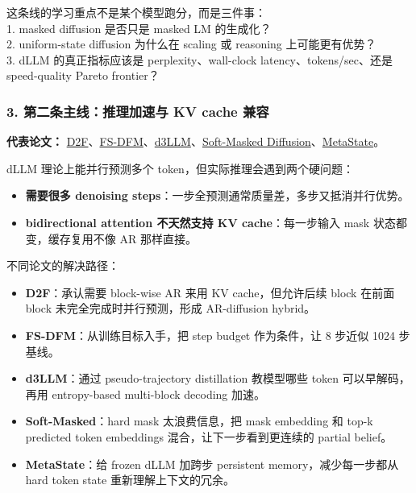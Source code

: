 \begin{summarybox}
这条线的学习重点不是某个模型跑分，而是三件事：\\
1. masked diffusion 是否只是 masked LM 的生成化？\\
2. uniform-state diffusion 为什么在 scaling 或 reasoning 上可能更有优势？\\
3. dLLM 的真正指标应该是 perplexity、wall-clock latency、tokens/sec、还是 speed-quality Pareto frontier？
\end{summarybox}

\subsubsection{3. 第二条主线：推理加速与 KV cache 兼容}

\textbf{代表论文：} \href{https://arxiv.org/abs/2508.09192}{D2F}、\href{https://arxiv.org/abs/2509.20624}{FS-DFM}、\href{https://arxiv.org/abs/2601.07568}{d3LLM}、\href{https://arxiv.org/abs/2510.17206}{Soft-Masked Diffusion}、\href{https://arxiv.org/abs/2603.01331}{MetaState}。

dLLM 理论上能并行预测多个 token，但实际推理会遇到两个硬问题：

\begin{itemize}[leftmargin=1.5em]
  \item \textbf{需要很多 denoising steps}：一步全预测通常质量差，多步又抵消并行优势。
  \item \textbf{bidirectional attention 不天然支持 KV cache}：每一步输入 mask 状态都变，缓存复用不像 AR 那样直接。
\end{itemize}

不同论文的解决路径：

\begin{itemize}[leftmargin=1.5em]
  \item \textbf{D2F}：承认需要 block-wise AR 来用 KV cache，但允许后续 block 在前面 block 未完全完成时并行预测，形成 AR-diffusion hybrid。
  \item \textbf{FS-DFM}：从训练目标入手，把 step budget 作为条件，让 8 步近似 1024 步基线。
  \item \textbf{d3LLM}：通过 pseudo-trajectory distillation 教模型哪些 token 可以早解码，再用 entropy-based multi-block decoding 加速。
  \item \textbf{Soft-Masked}：hard mask 太浪费信息，把 mask embedding 和 top-k predicted token embeddings 混合，让下一步看到更连续的 partial belief。
  \item \textbf{MetaState}：给 frozen dLLM 加跨步 persistent memory，减少每一步都从 hard token state 重新理解上下文的冗余。
\end{itemize}

